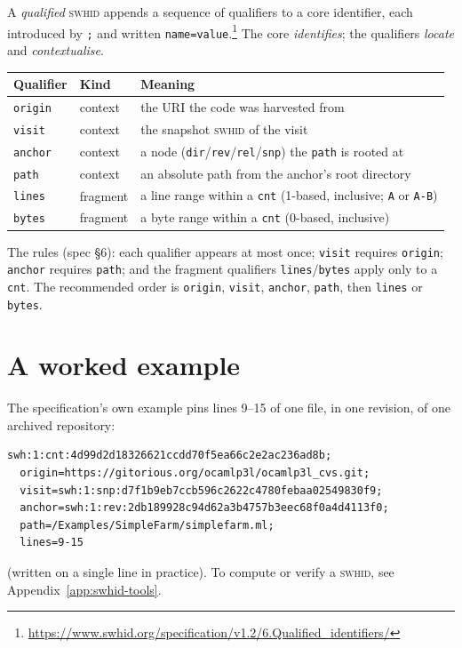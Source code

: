 A \emph{qualified} \textsc{swhid} appends a sequence of qualifiers to a core identifier, each
introduced by \texttt{;} and written \texttt{name=value}.\footnote{\url{https://www.swhid.org/specification/v1.2/6.Qualified_identifiers/}}
The core \emph{identifies}; the qualifiers \emph{locate} and \emph{contextualise}.

\begin{table}[htbp]
  \centering\small
  \begin{tabularx}{\linewidth}{@{}llX@{}}
    \toprule
    \textbf{Qualifier} & \textbf{Kind} & \textbf{Meaning} \\
    \midrule
    \texttt{origin} & context  & the URI the code was harvested from \\
    \texttt{visit}  & context  & the snapshot \textsc{swhid} of the visit \\
    \texttt{anchor} & context  & a node (\texttt{dir}/\texttt{rev}/\texttt{rel}/\texttt{snp}) the \texttt{path} is rooted at \\
    \texttt{path}   & context  & an absolute path from the anchor's root directory \\
    \texttt{lines}  & fragment & a line range within a \texttt{cnt} (1-based, inclusive; \texttt{A} or \texttt{A-B}) \\
    \texttt{bytes}  & fragment & a byte range within a \texttt{cnt} (0-based, inclusive) \\
    \bottomrule
  \end{tabularx}
\end{table}

The rules (spec \S6): each qualifier appears at most once; \texttt{visit} requires \texttt{origin};
\texttt{anchor} requires \texttt{path}; and the fragment qualifiers \texttt{lines}/\texttt{bytes}
apply only to a \texttt{cnt}. The recommended order is \texttt{origin}, \texttt{visit},
\texttt{anchor}, \texttt{path}, then \texttt{lines} or \texttt{bytes}.

\section{A worked example}

The specification's own example pins lines 9--15 of one file, in one revision, of one archived
repository:

\begin{verbatim}
swh:1:cnt:4d99d2d18326621ccdd70f5ea66c2e2ac236ad8b;
  origin=https://gitorious.org/ocamlp3l/ocamlp3l_cvs.git;
  visit=swh:1:snp:d7f1b9eb7ccb596c2622c4780febaa02549830f9;
  anchor=swh:1:rev:2db189928c94d62a3b4757b3eec68f0a4d4113f0;
  path=/Examples/SimpleFarm/simplefarm.ml;
  lines=9-15
\end{verbatim}

\noindent(written on a single line in practice). To compute or verify a \textsc{swhid}, see
Appendix~\ref{app:swhid-tools}.

